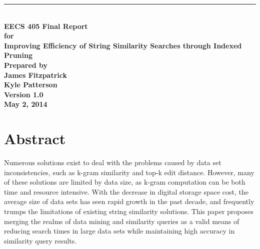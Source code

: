 \documentclass[pdftex,12pt,letter]{article}
\newcommand{\HRule}{\rule{\linewidth}{0.5mm}}
\begin{document}
\begin{titlepage}
\begin{flushright}
\HRule \\[0.4cm]
{ \bfseries
{\huge EECS 405 Final Report\\[1cm]}
{\Large for\\[1cm]}
{\large Improving Efficiency of String Similarity Searches through Indexed Pruning\\[3cm]}
{\large Prepared by\\[1cm]James Fitzpatrick\\Kyle Patterson\\[2cm]
Version 1.0\\
May 2, 2014\\
}}
\end{flushright}
\end{titlepage}

\tableofcontents\newpage

\section{Abstract}
Numerous solutions exist to deal with the problems caused by data set inconsistencies, such as k-gram similarity and top-k edit distance. However, many of these solutions are limited by data size, as k-gram computation can be both time and resource intensive. With the decrease in digital storage space cost, the average size of data sets has seen rapid growth in the past decade, and frequently trumps the limitations of existing string similarity solutions. This paper proposes merging the realms of data mining and similarity queries as a valid means of reducing search times in large data sets while maintaining high accuracy in similarity query results.
\end{document}
